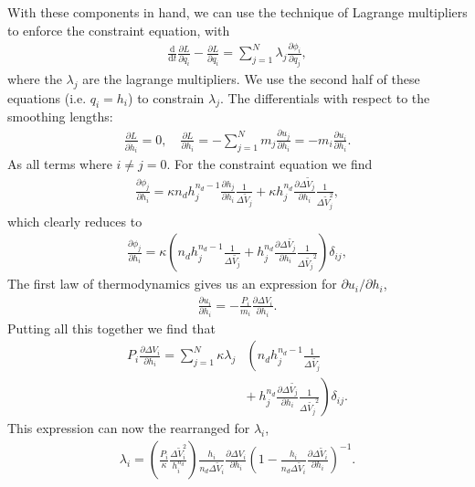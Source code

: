 With these components in hand, we can use the technique of Lagrange multipliers
to enforce the constraint equation, with
\begin{align}
  \frac{\mathrm{d}}{\mathrm{d}t} \frac{\partial L}{\partial \dot{q}_i} -
  \frac{\partial L}{\partial q_i} = 
  \sum^{N}_{j=1} \lambda_j \frac{\partial \phi_i}{\partial q_j},
  \label{eqn:sph:derivation:lmsum}
\end{align}
where the $\lambda_j$ are the lagrange multipliers.  We use the second half of
these equations (i.e. $q_i = h_i$) to constrain $\lambda_j$. The differentials
with respect to the smoothing lengths:
\begin{align}
  \frac{\partial L}{\partial \dot{h}_i} = 0, 
  \quad
  \frac{\partial L}{\partial h_i} =
  -\sum^N_{j=1}m_j\frac{\partial u_j}{\partial h_i} =
  -m_i \frac{\partial u_i}{\partial h_i}.
\end{align}
As all terms where $i \neq j = 0$. For the constraint equation we find
\begin{align}
  \frac{\partial \phi_j}{\partial h_i} = 
  \kappa n_d h_j^{n_d -1} \frac{\partial h_j}{\partial h_i}
    \frac{1}{\Delta \tilde{V}_j}
  + \kappa h_j^{n_d} \frac{\partial \Delta \tilde{V}_j}{\partial h_i}
    \frac{1}{\Delta \tilde{V}_j^2},
\end{align}
which clearly reduces to
\begin{align}
  \frac{\partial \phi_j}{\partial h_i} = \kappa
  \left(n_d h_j^{n_d - 1}  \frac{1}{\Delta \tilde{V_j}} +
    h_j^{n_d} \frac{\partial \Delta \tilde{V_j}}{\partial h_i}
    \frac{1}{\Delta \tilde{V_j}^2}
  \right)\delta_{ij},
\end{align}
The first law of thermodynamics gives us an expression for
${\partial u_i}/{\partial h_i}$,
\begin{align}
  \frac{\partial u_i}{\partial h_i} =
  -\frac{P_i}{m_i} \frac{\partial \Delta V_i}{\partial h_i}.
\end{align}
Putting all this together we find that
\begin{align}
  P_i \frac{\partial \Delta V_i}{\partial h_i} = 
  \sum^N_{j=1} \kappa \lambda_j
    & \left( n_d h_j^{n_d -1}  \frac{1}{\Delta \tilde{V_j}}\right. \nonumber\\
    & \left. + ~  h_j^{n_d} \frac{\partial \Delta \tilde{V_j}}{\partial h_i}
      \frac{1}{\Delta \tilde{V_j}^2}
  \right)\delta_{ij}.
\end{align}
This expression can now the rearranged for $\lambda_i$,
\begin{align}
  \lambda_i =
  \left(\frac{P_i}{\kappa} \frac{\Delta \tilde{V}^2_i}{h^{n_d}_i}\right)
    \frac{h_i}{n_d \Delta \tilde{V}_i}
    \frac{\partial \Delta V_i}{\partial h_i}
  \left(1 - \frac{h_i}{n_d \Delta \tilde{V}_i}
    \frac{\partial \Delta \tilde{V}_i}{\partial h_i}
  \right)^{-1}.
\end{align}
